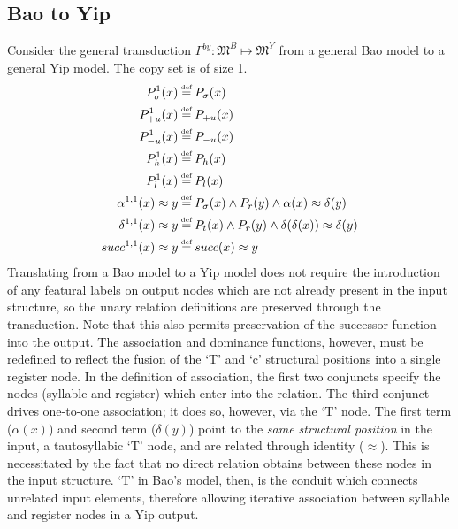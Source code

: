\documentclass{article}
\newcommand\myeq{\mathrel{\stackrel{\makebox[0pt]{\mbox{\normalfont\tiny def}}}{=}}}
\newcommand{\ap}{\approx}
\begin{document}
\subsection{Bao to Yip}
Consider the general transduction $\Gamma^{by}: \mathfrak{M}^{B} \mapsto \mathfrak{M}^{Y}$ from a general Bao model to a general Yip model. The copy set is of size 1.
\begin{equation}
\begin{aligned}
P^{1}_{\sigma}(x)&\myeq P_{\sigma}(x) \\
P^{1}_{+u}(x)&\myeq P_{+u}(x) \\
P^{1}_{-u}(x)&\myeq P_{-u}(x) \\
P^{1}_{h}(x)&\myeq P_{h}(x) \\
P^{1}_{l}(x)&\myeq P_{l}(x) \\
\alpha^{1,1}(x)\ap y&\myeq P_{\sigma}(x) \land P_{r}(y) \land \alpha(x) \ap \delta(y) \\
\delta^{1,1}(x)\ap y&\myeq P_{t}(x)\land P_{r}(y) \land  \delta(\delta(x)) \ap \delta(y)\\
succ^{1,1}(x)\ap y&\myeq succ(x)\ap y \\
\end{aligned}
\end{equation}
Translating from a Bao model to a Yip model does not require the introduction of any featural labels on output nodes which are not already present in the input structure, so the unary relation definitions are preserved through the transduction. Note that this also permits preservation of the successor function into the output. The association and dominance functions, however, must be redefined to reflect the fusion of the `T' and `c' structural positions into a single register node. In the definition of association, the first two conjuncts specify the nodes (syllable and register) which enter into the relation. The third conjunct drives one-to-one association; it does so, however, via the `T' node. The first term ($\alpha(x)$) and second term ($\delta(y)$) point to the \emph{same structural position} in the input, a tautosyllabic `T' node, and are related through identity ($\ap$). This is necessitated by the fact that no direct relation obtains between these nodes in the input structure. `T' in Bao's model, then, is the conduit which connects unrelated input elements, therefore allowing iterative association between syllable and register nodes in a Yip output. \par
\end{document}

